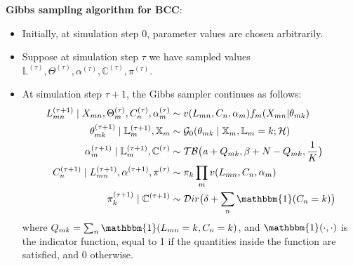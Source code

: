 \noindent\textbf{Gibbs sampling algorithm for BCC}: 
\begin{itemize}
\item {Initially, at simulation step 0, parameter values are chosen arbitrarily.}
\item {Suppose at simulation step $\tau$ we have sampled values $\mathbb{L}^{(\tau)}, \Theta^{(\tau)}, \alpha^{(\tau)}, \mathbb{C}^{(\tau)}, \pi^{(\tau)}$.}
\item { At simulation step $\tau + 1$, the Gibbs sampler continues as follows:
\begin{equation*}%
  \begin{aligned}
    L_{mn}^{(\tau+1)} \mid X_{mn}, \Theta_{m}^{(\tau)}, C_{n}^{(\tau)}, \alpha_{m}^{(\tau)} & \sim v(L_{mn}, C_{n}, \alpha_{m}) f_{m}(X_{mn}|\theta_{mk}) \\
	\theta_{mk}^{(\tau+1)} \mid \mathbb{L}_{m}^{(\tau+1)}, \mathbb{X}_{m} & \sim \mathcal{G}_{0}(\theta_{mk} \mid \mathbb{X}_{m}, \mathbb{L}_{m} = k; \mathcal{H}) \\
	\alpha_{m}^{(\tau+1)} \mid \mathbb{L}_{m}^{(\tau+1)}, \mathbb{C}^{(\tau)} & \sim \mathcal{TB} \big(\mathit{a} + Q_{mk}, \beta + N - Q_{mk}, \frac{1}{K}\big) \\
	C_{n}^{(\tau+1)} \mid L_{mn}^{(\tau+1)}, \alpha^{(\tau+1)}, \pi^{(\tau)} & \sim \pi_{k} \prod_{m}v(L_{mn}, C_{n}, \alpha_{m}) \\
	\pi_{k}^{(\tau+1)} \mid \mathbb{C}^{(\tau+1)} & \sim \mathcal{D}ir\big(\delta + \sum_{n}\mathbbm{1}(C_{n}=k)\big)
  \end{aligned}
\end{equation*}
where $Q_{mk} = \sum_{n}\mathbbm{1}(L_{mn}=k,C_{n}=k)$, and $\mathbbm{1}(\cdot,\cdot)$ is the indicator function, equal to 1 if the quantities inside the function are satisfied, and 0 otherwise.
}
\end{itemize}
